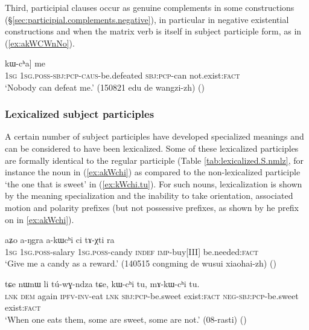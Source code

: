Third, participial clauses occur as genuine complements in some constructions (§\ref{sec:participial.complements.negative}), in particular in negative existential constructions and when the matrix verb is itself in subject participle form, as in (\ref{ex:akWCWnNo}).

\begin{exe}
\ex \label{ex:akWCWnNo}
\gll  [[aʑo a-kɯ-ɕɯ-nŋo] kɯ-cʰa] me  \\
\textsc{1sg} \textsc{1sg}.\textsc{poss}-\textsc{sbj}:\textsc{pcp}-\textsc{caus}-be.defeated \textsc{sbj}:\textsc{pcp}-can not.exist:\textsc{fact} \\
 \glt `Nobody can defeat me.' (150821 edu de wangzi-zh) ()
 \end{exe}
 
\subsubsection{Lexicalized subject participles} \label{sec:lexicalized.subject.participle}
A certain number of subject participles have developed specialized meanings and can be considered to have been lexicalized. Some of these lexicalized participles are formally identical to the regular participle (Table  \ref{tab:lexicalized.S.nmlz}, for instance the noun  in (\ref{ex:akWchi})  as compared to the non-lexicalized participle  `the one that is sweet' in (\ref{ex:kWchi.tu}). For such nouns, lexicalization is shown by the meaning specialization and the inability to take orientation, associated motion and polarity prefixes (but not possessive prefixes, as shown by he prefix  on  in \ref{ex:akWchi}).

\begin{exe}
\ex \label{ex:akWchi}
 \gll aʑo a-ŋgra a-kɯcʰi ci tɤ-χti ra \\
 \textsc{1sg} \textsc{1sg}.\textsc{poss}-salary \textsc{1sg}.\textsc{poss}-candy \textsc{indef} \textsc{imp}-buy[III] be.needed:\textsc{fact} \\
\glt `Give me a candy as a reward.' (140515 congming de wusui xiaohai-zh) ()
\end{exe}

\begin{exe}
\ex \label{ex:kWchi.tu}
 \gll tɕe nɯnɯ li tú-wɣ-ndza tɕe, kɯ-cʰi tu, mɤ-kɯ-cʰi tu. \\
\textsc{lnk} \textsc{dem} again \textsc{ipfv}-\textsc{inv}-eat \textsc{lnk} \textsc{sbj}:\textsc{pcp}-be.sweet exist:\textsc{fact} \textsc{neg}-\textsc{sbj}:\textsc{pcp}-be.sweet exist:\textsc{fact} \\
\glt `When one eats them, some are sweet, some are not.' (08-rasti)
()
\end{exe}

